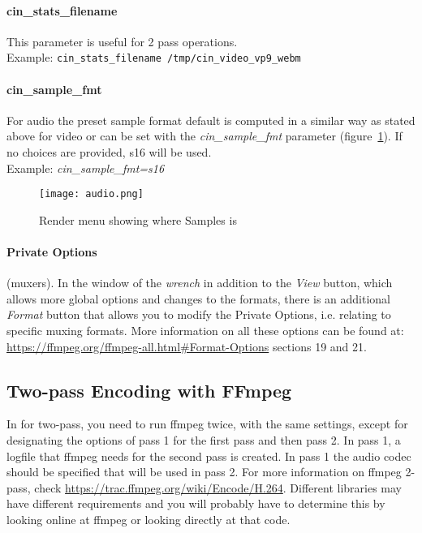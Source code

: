 \paragraph{cin\_stats\_filename} This parameter is useful for 2 pass operations.\\
Example: \texttt{cin\_stats\_filename /tmp/cin\_video\_vp9\_webm}

\paragraph{cin\_sample\_fmt} For audio the preset sample format default is computed in a similar way as stated above for video or can be set with the \textit{cin\_sample\_fmt} parameter (figure~\ref{fig:audio}).  If no choices are provided, s16 will be used.\\
Example: \textit{cin\_sample\_fmt=s16}

\begin{figure}[htpb]
    \centering
    \texttt{[image: audio.png]}
    \caption{Render menu showing where Samples is}
    \label{fig:audio}
\end{figure}

\paragraph{Private Options} (muxers). In the window of the \textit{wrench} in addition to the \textit{View} button, which allows more global options and changes to the formats, there is an additional \textit{Format} button that allows you to modify the Private Options, i.e. relating to specific muxing formats. More information on all these options can be found at: {\small \url{https://ffmpeg.org/ffmpeg-all.html#Format-Options}} sections 19 and 21.

\subsection{Two-pass Encoding with FFmpeg}%
\label{sub:two_pass_encoding_ffmpeg}

In \CGG{} for two-pass, you need to run ffmpeg twice, with the same settings, except for designating the options of pass 1 for the first pass and then pass 2.  In pass 1, a logfile that ffmpeg needs for the second pass is created.  In pass 1 the audio codec should be specified that will be used in pass 2.  For more information on ffmpeg 2-pass, check {\small \url{https://trac.ffmpeg.org/wiki/Encode/H.264}}.  Different libraries may have different requirements and you will probably have to determine this by looking online at ffmpeg or looking directly at that code.

